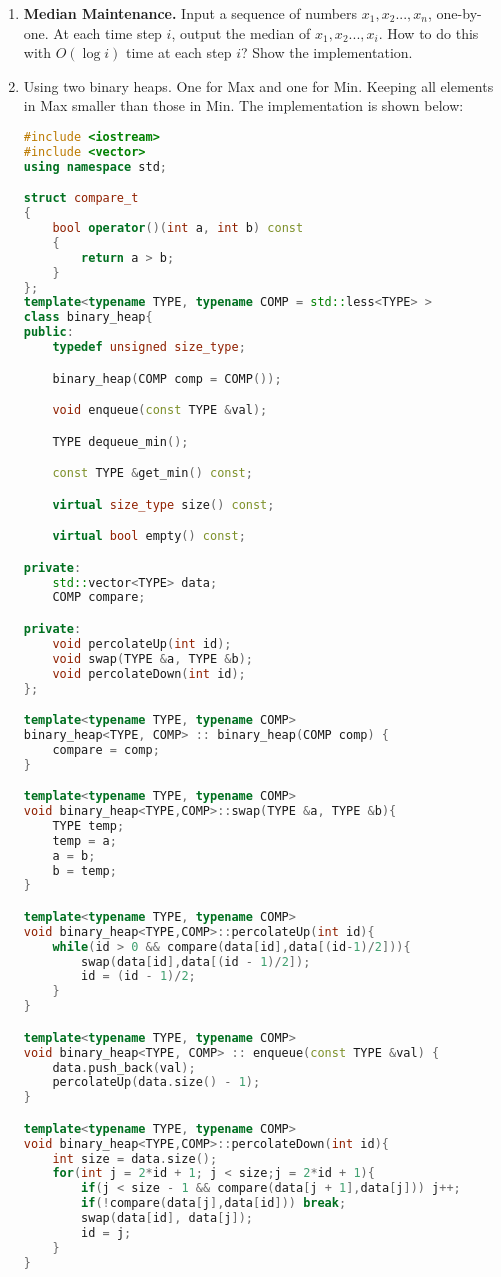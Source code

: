 \documentclass[12pt,a4paper]{article}
\makeatletter
\newtheorem*{solution}{Solution}
\theoremstyle{definition}
\renewenvironment{solution}[1][Solution] {\par\pushQED{\qed}\normalfont\topsep6\p@\@plus6\p@\relax\trivlist\item[\hskip\labelsep\bfseries#1\@addpunct{.}]\ignorespaces}{\popQED\endtrivlist\@endpefalse} \makeatother
\makeatother
\begin{document}
\begin{enumerate}
\item \textbf{Median Maintenance.} Input a sequence of numbers $x_1,x_2...,x_n$, one-by-one. At each time step $i$, output the median of $x_1,x_2...,x_i$. How to do this with $O(\log i)$ time at each step $i$? Show the implementation.
\begin{solution}
Using two binary heaps. One for Max and one for Min. Keeping all elements in Max smaller than those in Min. The implementation is shown below:
\end{solution}
\begin{lstlisting}[language=C++]
#include <iostream>
#include <vector>
using namespace std;

struct compare_t
{
    bool operator()(int a, int b) const
    {
        return a > b;
    }
};
template<typename TYPE, typename COMP = std::less<TYPE> >
class binary_heap{
public:
    typedef unsigned size_type;

    binary_heap(COMP comp = COMP());

    void enqueue(const TYPE &val);

    TYPE dequeue_min();

    const TYPE &get_min() const;

    virtual size_type size() const;

    virtual bool empty() const;

private:
    std::vector<TYPE> data;
    COMP compare;

private:
    void percolateUp(int id);
    void swap(TYPE &a, TYPE &b);
    void percolateDown(int id);
};

template<typename TYPE, typename COMP>
binary_heap<TYPE, COMP> :: binary_heap(COMP comp) {
    compare = comp;
}

template<typename TYPE, typename COMP>
void binary_heap<TYPE,COMP>::swap(TYPE &a, TYPE &b){
    TYPE temp;
    temp = a;
    a = b;
    b = temp;
}

template<typename TYPE, typename COMP>
void binary_heap<TYPE,COMP>::percolateUp(int id){
    while(id > 0 && compare(data[id],data[(id-1)/2])){
        swap(data[id],data[(id - 1)/2]);
        id = (id - 1)/2;
    }
}

template<typename TYPE, typename COMP>
void binary_heap<TYPE, COMP> :: enqueue(const TYPE &val) {
    data.push_back(val);
    percolateUp(data.size() - 1);
}

template<typename TYPE, typename COMP>
void binary_heap<TYPE,COMP>::percolateDown(int id){
    int size = data.size();
    for(int j = 2*id + 1; j < size;j = 2*id + 1){
        if(j < size - 1 && compare(data[j + 1],data[j])) j++;
        if(!compare(data[j],data[id])) break;
        swap(data[id], data[j]);
        id = j;
    }
}


\end{lstlisting}
\end{enumerate}
\end{document}
